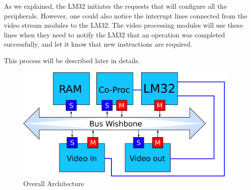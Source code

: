 As we explained, the LM32 initiates the requests that will configure all the peripherals. However, one could also notice the interrupt lines connected from the video stream modules to the LM32. The video processing modules will use these lines when they need to notify the LM32 that an operation was completed successfully, and let it know that new instructions are required.

This process will be described later in details.

\begin{figure}[h]
	\center
	\includegraphics[width=11cm]{figs/overall_arch.pdf}

	\caption{Overall Architecture}
	\label{archi}
\end{figure}
